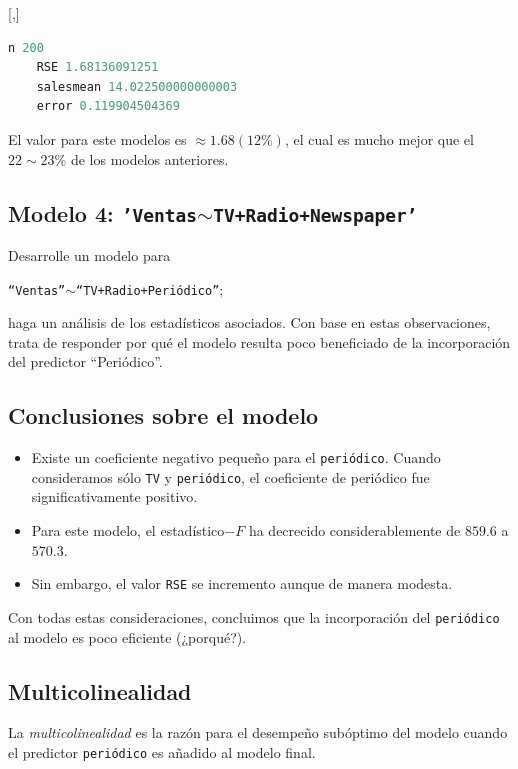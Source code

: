 [,]{}
\begin{lstlisting}[language=Python]
	n 200
	RSE 1.68136091251
	salesmean 14.022500000000003
	error 0.119904504369
\end{lstlisting}


El valor para este modelos es $\approx 1.68 (12\%)$, el cual es mucho mejor que el $22\sim23\%$ de los modelos anteriores.

\subsection{Modelo 4: \texttt{'Ventas$\sim$TV+Radio+Newspaper'}}

\begin{ejemplo}
	Desarrolle un modelo para
	\begin{center}
		\texttt{``Ventas''$\sim$``TV+Radio+Periódico''};
	\end{center}
	haga un análisis de los estadísticos asociados.  Con base en estas observaciones, trata de responder por qué el modelo resulta poco beneficiado de la incorporación del predictor ``Periódico''.
\end{ejemplo}


\subsection{Conclusiones sobre el modelo}
\begin{itemize}
	\item Existe un coeficiente negativo pequeño para el \texttt{periódico}.  Cuando consideramos sólo \texttt{TV} y \texttt{periódico}, el coeficiente de periódico fue significativamente positivo. 
	\item Para este modelo, el estadístico$-F$ ha decrecido considerablemente de $859.6$ a $570.3$. 
	\item Sin embargo, el valor \texttt{RSE} se incremento aunque de manera modesta. 
\end{itemize}
Con todas estas consideraciones, concluimos que la incorporación del \texttt{periódico} al modelo es poco eficiente (¿porqué?).

\subsection{Multicolinealidad}

La \emph{multicolinealidad} es la razón para el desempeño subóptimo del modelo cuando el predictor \texttt{periódico} es añadido al modelo final.

